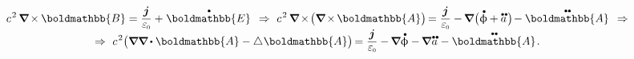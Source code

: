 \nopagebreak\vspace{-0.1em}\begin{multline}\label{electromagnetic.secondequationofwave}
c^{\hspace{.16ex}2} \hspace{.4ex} \boldnabla \hspace{-0.15ex} \times \hspace{-0.1ex} \boldmathbb{B}
= \displaystyle \frac{\bm{j}}{\raisemath{.16em}{\vacuumpermittivity}} + \hspace{.1ex} \mathdotabove{\boldmathbb{E}}
\hspace{.44em} \Rightarrow \hspace{.33em}
%
c^{\hspace{.16ex}2} \hspace{.4ex} \boldnabla \hspace{-0.2ex} \times \hspace{-0.3ex} \bigl( \boldnabla \hspace{-0.2ex} \times \hspace{-0.2ex} \boldmathbb{A} \bigr) \hspace{-0.25ex}
= \displaystyle \frac{\bm{j}}{\raisemath{.16em}{\vacuumpermittivity}} - \hspace{-0.15ex} \boldnabla \hspace{.1ex} \bigl( \mathdotabove{\upphi} \hspace{-0.1ex} + \mathdotdotabove{a} \hspace{.2ex} \bigr) \hspace{-0.3ex} - \mathdotdotabove{\boldmathbb{A}}
\hspace{.44em} \Rightarrow
%
\\[-0.4em]
%
\Rightarrow \hspace{.33em}
c^{\hspace{.16ex}2} \bigl( \boldnabla \boldnabla \hspace{-0.1ex} \dotp \boldmathbb{A} - \Laplacian \hspace{.05ex} \boldmathbb{A} \bigr) \hspace{-0.25ex}
= \displaystyle \frac{\bm{j}}{\raisemath{.16em}{\vacuumpermittivity}} - \hspace{-0.15ex} \boldnabla \mathdotabove{\upphi} - \hspace{-0.15ex} \boldnabla \hspace{.1ex} \mathdotdotabove{a} \hspace{.1ex} - \mathdotdotabove{\boldmathbb{A}}
\hspace{.2ex} .
\end{multline}

